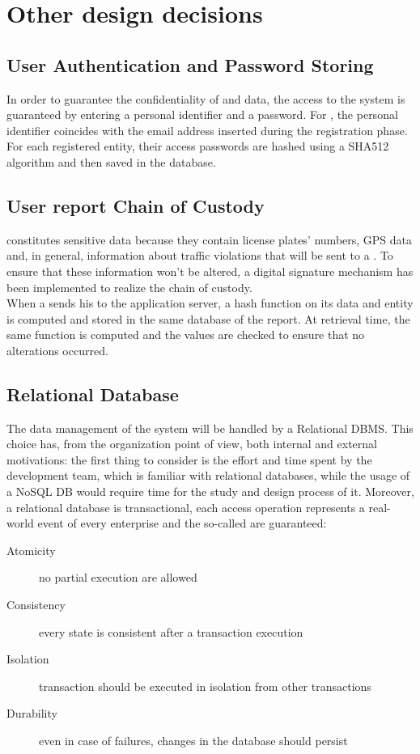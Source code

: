 \documentclass[../../DD.tex]{subfiles}
\begin{document}
\section{Other design decisions\label{sect:2.7}}

\subsection{User Authentication and Password Storing\label{2.7.1}}
In order to guarantee the confidentiality of  and  data, the access to the system is guaranteed by entering a personal identifier and a password. For , the personal identifier coincides with the email address inserted during the registration phase. \\

For each registered entity, their access passwords are hashed using a SHA512 algorithm and then saved in the database.

\subsection{User report Chain of Custody\label{2.7.2}}
 constitutes sensitive data because they contain license plates' numbers, GPS data and, in general, information about traffic violations that will be sent to a . To ensure that these information won't be altered, a digital signature mechanism has been implemented to realize the chain of custody. \\

When a  sends his  to the application server, a hash function on its data and  entity is computed and stored in the same database of the report. At retrieval time, the same function is computed and the values are checked to ensure that no alterations occurred.

\subsection{Relational Database\label{2.7.3}}
The data management of the system will be handled by a Relational DBMS. This choice has, from the organization point of view, both internal and external motivations: the first thing to consider is the effort and time spent by the development team, which is familiar with relational databases, while the usage of a NoSQL DB would require time for the study and design process of it.
Moreover, a relational database is transactional, each access operation represents a real-world event of every enterprise and the so-called  are guaranteed: 

	\begin{description}
		\item[Atomicity] no partial execution are allowed
		\item[Consistency] every state is consistent after a transaction execution
		\item[Isolation] transaction should be executed in isolation from other transactions
		\item[Durability] even in case of failures, changes in the database should persist
	\end{description}
\end{document}
